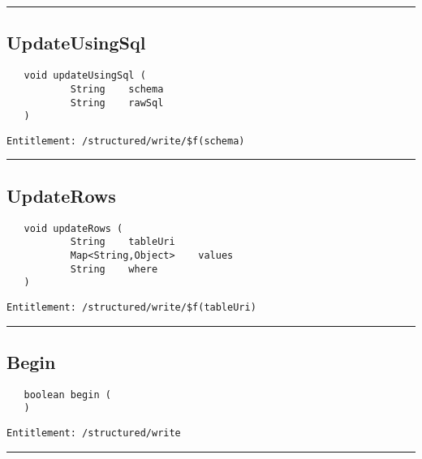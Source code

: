 \rule{12cm}{2pt}
\subsection{UpdateUsingSql}
\label{Api:UpdateUsingSql}
\begin{Verbatim}
   void updateUsingSql (
           String    schema
           String    rawSql
   )
\end{Verbatim}
\begin{Verbatim}[formatcom=\color{Maroon}]
  Entitlement: /structured/write/$f(schema)
\end{Verbatim}



\rule{12cm}{2pt}
\subsection{UpdateRows}
\label{Api:UpdateRows}
\begin{Verbatim}
   void updateRows (
           String    tableUri
           Map<String,Object>    values
           String    where
   )
\end{Verbatim}
\begin{Verbatim}[formatcom=\color{Maroon}]
  Entitlement: /structured/write/$f(tableUri)
\end{Verbatim}



\rule{12cm}{2pt}
\subsection{Begin}
\label{Api:Begin}
\begin{Verbatim}
   boolean begin (
   )
\end{Verbatim}
\begin{Verbatim}[formatcom=\color{Maroon}]
  Entitlement: /structured/write
\end{Verbatim}



\rule{12cm}{2pt}
